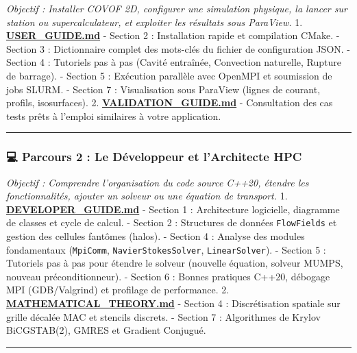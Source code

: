 \documentclass[
  french,
]{article}
\begin{document}
\emph{Objectif : Installer COVOF 2D, configurer une simulation physique,
la lancer sur station ou supercalculateur, et exploiter les résultats
sous ParaView.} 1.
\textbf{\href{file:///Users/elhadjiibrahimathiam/Documents/PROJET_ANTIGRAVITY/COVOF_2D-C++/docs/USER_GUIDE.md}{USER\_GUIDE.md}}
- Section 2 : Installation rapide et compilation CMake. - Section 3 :
Dictionnaire complet des mots-clés du fichier de configuration JSON. -
Section 4 : Tutoriels pas à pas (Cavité entraînée, Convection naturelle,
Rupture de barrage). - Section 5 : Exécution parallèle avec OpenMPI et
soumission de jobs SLURM. - Section 7 : Visualisation sous ParaView
(lignes de courant, profils, isosurfaces). 2.
\textbf{\href{file:///Users/elhadjiibrahimathiam/Documents/PROJET_ANTIGRAVITY/COVOF_2D-C++/docs/VALIDATION_GUIDE.md}{VALIDATION\_GUIDE.md}}
- Consultation des cas tests prêts à l'emploi similaires à votre
application.

\begin{center}\rule{0.5\linewidth}{0.5pt}\end{center}

\subsubsection{💻 Parcours 2 : Le Développeur et l'Architecte
HPC}\label{parcours-2-le-duxe9veloppeur-et-larchitecte-hpc}

\emph{Objectif : Comprendre l'organisation du code source C++20, étendre
les fonctionnalités, ajouter un solveur ou une équation de transport.}
1.
\textbf{\href{file:///Users/elhadjiibrahimathiam/Documents/PROJET_ANTIGRAVITY/COVOF_2D-C++/docs/DEVELOPER_GUIDE.md}{DEVELOPER\_GUIDE.md}}
- Section 1 : Architecture logicielle, diagramme de classes et cycle de
calcul. - Section 2 : Structures de données \texttt{FlowFields} et
gestion des cellules fantômes (halos). - Section 4 : Analyse des modules
fondamentaux (\texttt{MpiComm}, \texttt{NavierStokesSolver},
\texttt{LinearSolver}). - Section 5 : Tutoriels pas à pas pour étendre
le solveur (nouvelle équation, solveur MUMPS, nouveau préconditionneur).
- Section 6 : Bonnes pratiques C++20, débogage MPI (GDB/Valgrind) et
profilage de performance. 2.
\textbf{\href{file:///Users/elhadjiibrahimathiam/Documents/PROJET_ANTIGRAVITY/COVOF_2D-C++/docs/MATHEMATICAL_THEORY.md}{MATHEMATICAL\_THEORY.md}}
- Section 4 : Discrétisation spatiale sur grille décalée MAC et stencils
discrets. - Section 7 : Algorithmes de Krylov BiCGSTAB(2), GMRES et
Gradient Conjugué.

\begin{center}\rule{0.5\linewidth}{0.5pt}\end{center}
\end{document}
